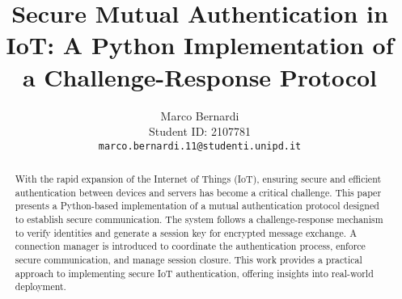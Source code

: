 \documentclass[10pt,twocolumn,letterpaper]{article}
\begin{document}
\title{Secure Mutual Authentication in IoT: A Python Implementation of a Challenge-Response Protocol}

\author{
Marco Bernardi \\
Student ID: 2107781 \\
{\tt\small marco.bernardi.11@studenti.unipd.it}
}

\maketitle

\begin{abstract}With the rapid expansion of the Internet of Things (IoT), ensuring secure and efficient authentication between devices and servers has become a critical challenge.
    This paper presents a Python-based implementation of a mutual authentication protocol designed to establish secure communication.
    The system follows a challenge-response mechanism to verify identities and generate a session key for encrypted message exchange.
    A connection manager is introduced to coordinate the authentication process, enforce secure communication, and manage session closure.
    This work provides a practical approach to implementing secure IoT authentication, offering insights into real-world deployment.~\cite{8455985}
\end{abstract}

\end{document}
